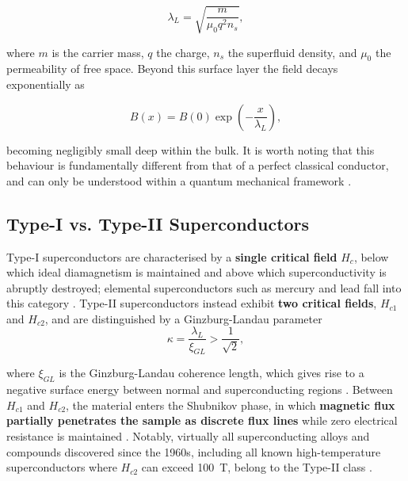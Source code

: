 \documentclass[a4paper,11pt]{article}
\numberwithin{equation}{section}
\begin{document}
\begin{equation}
    \lambda_L = \sqrt{\frac{m}{\mu_0 q^2 n_s}},
    \label{eq:london_depth}
\end{equation}

where $m$ is the carrier mass, $q$ the charge, $n_s$ the superfluid 
density, and $\mu_0$ the permeability of free space. Beyond this surface 
layer the field decays exponentially as

\begin{equation}
    B(x) = B(0)\exp\!\left(-\frac{x}{\lambda_L}\right),
    \label{eq:field_decay}
\end{equation}

becoming negligibly small deep within the bulk. It is worth noting that 
this behaviour is fundamentally different from that of a perfect classical 
conductor, and can only be understood within a quantum mechanical 
framework \cite{Buckel2004, Tinkham1996}.



\subsection{Type-I vs. Type-II Superconductors}

Type-I superconductors are characterised by a \textbf{single critical field} $H_c$, 
below which ideal diamagnetism is maintained and above which 
superconductivity is abruptly destroyed; elemental superconductors such 
as mercury and lead fall into this category \cite{Buckel2004, Tinkham1996}. 
Type-II superconductors instead exhibit \textbf{two critical fields}, $H_{c1}$ and 
$H_{c2}$, and are distinguished by a Ginzburg-Landau parameter
\begin{equation}
    \kappa = \frac{\lambda_L}{\xi_{GL}} > \frac{1}{\sqrt{2}},
    \label{eq:GL_param}
\end{equation}

where $\xi_{GL}$ is the Ginzburg-Landau coherence length, which gives 
rise to a negative surface energy between normal and superconducting 
regions \cite{abrikosov2003, Tinkham1996}. Between $H_{c1}$ and 
$H_{c2}$, the material enters the Shubnikov phase, in which \textbf{magnetic 
flux partially penetrates the sample as discrete flux lines} while zero 
electrical resistance is maintained \cite{Buckel2004}. Notably, virtually 
all superconducting alloys and compounds discovered since the 1960s, 
including all known high-temperature superconductors where $H_{c2}$ can 
exceed 100~T, belong to the Type-II class \cite{abrikosov2003, Buckel2004}.
\end{document}
